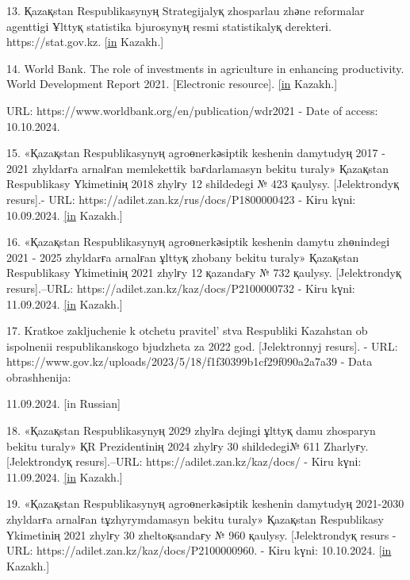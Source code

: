 {{13. Қazaқstan Respublikasynyң Strategijalyқ zhosparlau zhәne reformalar
agenttіgі Ұlttyқ statistika bjurosynyң resmi statistikalyқ derekterі.
https://stat.gov.kz.
\href{https://kaz.zakon.kz/kogam-tynysy/6048484.\%20\%20\%20\%5bin}{{[}in}
Kazakh.{]}

14. World Bank. The role of investments in agriculture in enhancing
productivity. World Development Report 2021. {[}Electronic resource{]}.
\href{https://kaz.zakon.kz/kogam-tynysy/6048484.\%20\%20\%20\%5bin}{{[}in}
Kazakh.{]}

URL: https://www.worldbank.org/en/publication/wdr2021 - Date of access:
10.10.2024.

15. «Қazaқstan Respublikasynyң agroөnerkәsіptіk keshenіn damytudyң 2017
- 2021 zhyldarғa arnalғan memlekettіk baғdarlamasyn bekіtu turaly»
Қazaқstan Respublikasy Үkіmetіnің 2018 zhylғy 12 shіldedegі № 423
қaulysy. {[}Jelektrondyқ resurs{]}.- URL:
https://adilet.zan.kz/rus/docs/P1800000423 - Kіru kүnі: 10.09.2024.
\href{https://kaz.zakon.kz/kogam-tynysy/6048484.\%20\%20\%20\%5bin}{{[}in}
Kazakh.{]}

16. «Қazaқstan Respublikasynyң agroөnerkәsіptіk keshenіn damytu
zhөnіndegі 2021 - 2025 zhyldarғa arnalғan ұlttyқ zhobany bekіtu turaly»
Қazaқstan Respublikasy Үkіmetіnің 2021 zhylғy 12 қazandaғy № 732
қaulysy. {[}Jelektrondyқ resurs{]}.--URL:
https://adilet.zan.kz/kaz/docs/P2100000732 - Kіru kүnі: 11.09.2024.
\href{https://kaz.zakon.kz/kogam-tynysy/6048484.\%20\%20\%20\%5bin}{{[}in}
Kazakh.{]}

17. Kratkoe zakljuchenie k otchetu pravitel' stva
Respubliki Kazahstan ob ispolnenii respublikanskogo bjudzheta za 2022
god. {[}Jelektronnyj resurs{]}. - URL:
https://www.gov.kz/uploads/2023/5/18/f1f30399b1cf29f090a2a7a39 - Data
obrashhenija:

11.09.2024. {[}in Russian{]}

18. «Қazaқstan Respublikasynyң 2029 zhylғa dejіngі ұlttyқ damu zhosparyn
bekіtu turaly» ҚR Prezidentіnің 2024 zhylғy 30 shіldedegі№ 611 Zharlyғy.
{[}Jelektrondyқ resurs{]}.--URL: https://adilet.zan.kz/kaz/docs/ - Kіru
kүnі: 11.09.2024.
\href{https://kaz.zakon.kz/kogam-tynysy/6048484.\%20\%20\%20\%5bin}{{[}in}
Kazakh.{]}

19. «Қazaқstan Respublikasynyң agroөnerkәsіptіk keshenіn damytudyң
2021-2030 zhyldarғa arnalғan tұzhyrymdamasyn bekіtu turaly» Қazaқstan
Respublikasy Үkіmetіnің 2021 zhylғy 30 zheltoқsandaғy № 960 қaulysy.
{[}Jelektrondyқ resurs - URL:
https://adilet.zan.kz/kaz/docs/P2100000960. - Kіru kүnі: 10.10.2024.
\href{https://kaz.zakon.kz/kogam-tynysy/6048484.\%20\%20\%20\%5bin}{{[}in}
Kazakh.{]}

}}
